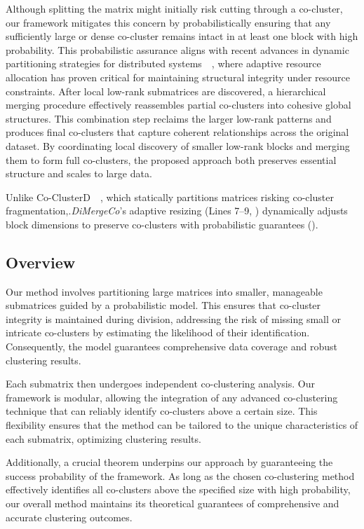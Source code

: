 \documentclass[journal]{IEEEtran}
\renewcommand{\cite}[1]{~\autocite{#1}}
\begin{document}
Although splitting the matrix might initially risk cutting through a co-cluster, our framework mitigates this concern by probabilistically ensuring that any sufficiently large or dense co-cluster remains intact in at least one block with high probability. This probabilistic assurance aligns with recent advances in dynamic partitioning strategies for distributed systems~\cite{huang2024EnergyAwareIntegratedNeural}, where adaptive resource allocation has proven critical for maintaining structural integrity under resource constraints. After local low-rank submatrices are discovered, a hierarchical merging procedure effectively reassembles partial co-clusters into cohesive global structures. This combination step reclaims the larger low-rank patterns and produces final co-clusters that capture coherent relationships across the original dataset. By coordinating local discovery of smaller low-rank blocks and merging them to form full co-clusters, the proposed approach both preserves essential structure and scales to large data.

Unlike Co-ClusterD~\cite{cheng2015CoClusterDDistributedFramework}, which statically partitions matrices risking co-cluster fragmentation,.\emph{DiMergeCo}'s adaptive resizing (Lines 7--9, ) dynamically adjusts block dimensions to preserve co-clusters with probabilistic guarantees ().

\subsection{Overview}
\label{subsec:overview}
Our method involves partitioning large matrices into smaller, manageable submatrices guided by a probabilistic model. This ensures that co-cluster integrity is maintained during division, addressing the risk of missing small or intricate co-clusters by estimating the likelihood of their identification. Consequently, the model guarantees comprehensive data coverage and robust clustering results.

Each submatrix then undergoes independent co-clustering analysis. Our framework is modular, allowing the integration of any advanced co-clustering technique that can reliably identify co-clusters above a certain size. This flexibility ensures that the method can be tailored to the unique characteristics of each submatrix, optimizing clustering results.

Additionally, a crucial theorem underpins our approach by guaranteeing the success probability of the framework. As long as the chosen co-clustering method effectively identifies all co-clusters above the specified size with high probability, our overall method maintains its theoretical guarantees of comprehensive and accurate clustering outcomes.
\end{document}
